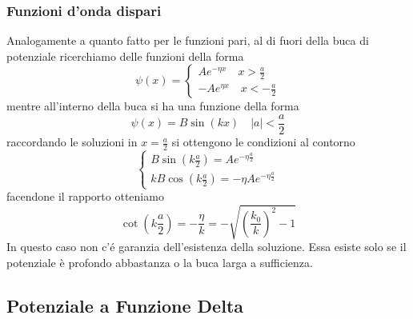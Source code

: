 \subsubsection{Funzioni d'onda dispari}
Analogamente a quanto fatto per le funzioni pari, al di fuori della buca di potenziale ricerchiamo delle funzioni della forma 
\begin{equation*}
\psi(x) = 
\begin{cases}
	Ae^{-\eta x} \quad x > \frac{a}{2}\\
	-Ae^{\eta x} \quad x < -\frac{a}{2}
\end{cases}
\end{equation*}
mentre all'interno della buca si ha una funzione della forma 
\begin{equation*}
	\psi(x) = B\sin(kx) \quad |a| < \frac{a}{2}
\end{equation*}
raccordando le soluzioni in $x = \frac{a}{2}$ si ottengono le condizioni al contorno
\begin{equation*}
	\begin{cases}
B \sin \left( k \frac{a}{2} \right ) = A e^{-\eta \frac{a}{2}} \\
k B \cos \left (k \frac{a}{2} \right)   =-\eta A e^{-\eta \frac{a}{2}}
\end{cases}
\end{equation*}
facendone il rapporto otteniamo
\begin{equation*}
	\cot \left (k \frac{a}{2} \right) = - \frac{\eta}{k} = - \sqrt{\left (\frac{k_0}{k}\right)^2 -1}
\end{equation*}
In questo caso non c'\'e garanzia dell'esistenza della soluzione. Essa esiste solo se il potenziale \`e profondo abbastanza o la buca larga a sufficienza.

\subsection{Potenziale a Funzione Delta}

